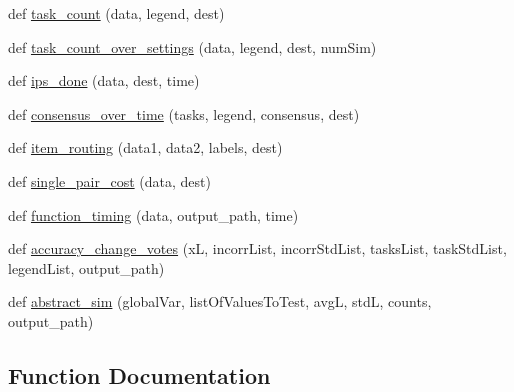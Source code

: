 \begin{DoxyCompactItemize}
def \mbox{\hyperlink{namespacedynamicfilterapp_1_1graph_gen_a8db1f76661e4aea8b1d2145681ae2696}{task\+\_\+count}} (data, legend, dest)
\item 
def \mbox{\hyperlink{namespacedynamicfilterapp_1_1graph_gen_a29b3308a8c942d63d818e0ac5fea6920}{task\+\_\+count\+\_\+over\+\_\+settings}} (data, legend, dest, num\+Sim)
\item 
def \mbox{\hyperlink{namespacedynamicfilterapp_1_1graph_gen_a94b7f314ce8dfce16b7776cba4129992}{ips\+\_\+done}} (data, dest, time)
\item 
def \mbox{\hyperlink{namespacedynamicfilterapp_1_1graph_gen_ae4d60fdc4756e001059acb14cbb6821c}{consensus\+\_\+over\+\_\+time}} (tasks, legend, consensus, dest)
\item 
def \mbox{\hyperlink{namespacedynamicfilterapp_1_1graph_gen_a9e34d7128010818130474df31fac89c5}{item\+\_\+routing}} (data1, data2, labels, dest)
\item 
def \mbox{\hyperlink{namespacedynamicfilterapp_1_1graph_gen_a09e4e7b19b279838511f1806d4f7f2bd}{single\+\_\+pair\+\_\+cost}} (data, dest)
\item 
def \mbox{\hyperlink{namespacedynamicfilterapp_1_1graph_gen_a829d8f63431b6a26381a167956e0c3a2}{function\+\_\+timing}} (data, output\+\_\+path, time)
\item 
def \mbox{\hyperlink{namespacedynamicfilterapp_1_1graph_gen_ab75745d1f7f725285dba82b7e5d27e50}{accuracy\+\_\+change\+\_\+votes}} (xL, incorr\+List, incorr\+Std\+List, tasks\+List, task\+Std\+List, legend\+List, output\+\_\+path)
\item 
def \mbox{\hyperlink{namespacedynamicfilterapp_1_1graph_gen_a19198a79ec71a19f9461487769b622f8}{abstract\+\_\+sim}} (global\+Var, list\+Of\+Values\+To\+Test, avgL, stdL, counts, output\+\_\+path)
\end{DoxyCompactItemize}


\subsection{Function Documentation}
\mbox{\label{namespacedynamicfilterapp_1_1graph_gen_a19198a79ec71a19f9461487769b622f8}} 
